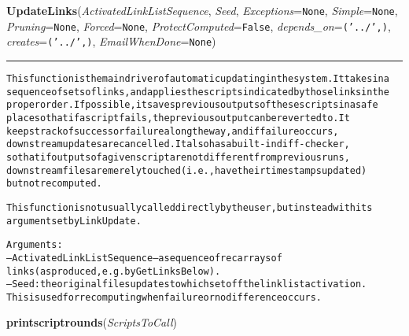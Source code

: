 \hspace{.8\funcindent}\begin{boxedminipage}{\funcwidth}

    \raggedright \textbf{UpdateLinks}(\textit{ActivatedLinkListSequence}, \textit{Seed}, \textit{Exceptions}={\tt None}, \textit{Simple}={\tt None}, \textit{Pruning}={\tt None}, \textit{Forced}={\tt None}, \textit{ProtectComputed}={\tt False}, \textit{depends\_on}={\tt ('../',)}, \textit{creates}={\tt ('../',)}, \textit{EmailWhenDone}={\tt None})

    \vspace{-1.5ex}

    \rule{\textwidth}{0.5\fboxrule}
\setlength{\parskip}{2ex}
\begin{alltt}
This function is the main driver of automatic updating in the system.  It takes in a
sequence of sets of links, and applies the scripts indicated by those links in the 
proper order.  If possible, it saves previous outputs of these scripts in a safe 
place so that if a script fails, the previous output can be reverted to.  It 
keeps track of success or failure along the way, and if failure occurs,
downstream updates are cancelled.   It also has a built-in diff-checker, 
so that if outputs of a given script are not different from previous runs, 
downstream files are merely touched (i.e., have their timestamps updated) 
but not recomputed.  

This function is not usually called directly by the user, but instead with its 
arguments et by LinkUpdate. 

Arguments:
--ActivatedLinkListSequence -- a sequence of recarrays of 
        links (as produced, e.g. by GetLinksBelow).  
--Seed:  the original files updates to which set off the linklist activation.  
        This is used for recomputing when failure or no difference occurs. 
                        
\end{alltt}

\setlength{\parskip}{1ex}
    \end{boxedminipage}

    \label{System:Update:printscriptrounds}

    \vspace{0.5ex}

\hspace{.8\funcindent}\begin{boxedminipage}{\funcwidth}

    \raggedright \textbf{printscriptrounds}(\textit{ScriptsToCall})

\setlength{\parskip}{2ex}
\setlength{\parskip}{1ex}
    \end{boxedminipage}


